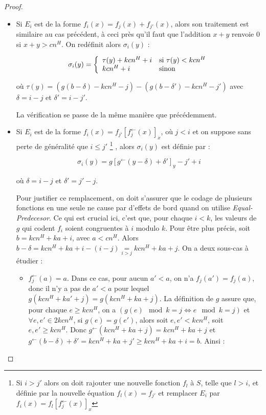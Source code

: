 \documentclass{article}
\newcommand{\eqpred}[3]{#1\left[ #2^{\leftarrow}(#3) \right]_{#3}}
\newcommand{\eqpredfi}[5]{#1\left[ #2^{\leftarrow}(#3) #4 \right]_{#5}} %
\begin{document}
\begin{proof}
\begin{enumerate}[itemsep=-1mm,leftmargin=2cm]
\begin{itemize}[itemsep=-1mm, leftmargin=1cm]
						\item
							Si $E_i$ est de la forme $f_i(x) = f_j(x) + f_{j'}(x)$, alors son traitement est similaire au cas précédent, à ceci près qu'il faut que l'addition $x + y$ renvoie $0$ si $x + y > cn^H$. On redéfinit alors $\sigma_i(y)$ : 
							
							\[
								\sigma_i(y) = \left\lbrace \begin{array}{ll} 
									\tau(y) + kcn^H + i & \text{si $\tau(y) < kcn^H$} \\
									kcn^H + i & \text{sinon}
									 \end{array} \right.
							\]
							
							où $\tau(y) = \left( g\left( b - \delta \right) - kcn^H - j \right) - \left( g\left( b - \delta' \right) - kcn^H - j' \right)$ avec $\delta = i - j$ et $\delta' = i - j'$. 
							
							La vérification se passe de la même manière que précédemment.
							
						\item
							Si $E_i$ est de la forme $f_i(x) = \eqpred{f_{j'}}{f_j}{x}$, où $j < i$ et on suppose sans perte de généralité que $i \leqslant j'$ 
								\footnote{Si $i > j'$ alors on doit rajouter une nouvelle fonction $f_l$ à $S$, telle que $l > i$, et définie par la nouvelle équation $f_l(x) = f_{j'}$ et remplacer $E_i$ par $f_i(x) = \eqpred{f_{l}}{f_j}{x}$}
							, alors $\sigma_i(y)$ est définie par :
							
							\[
								\sigma_i(y) = \eqpredfi{g}{g}{y-\delta}{ + \delta'}{y} - j' + i
							\]
							
							où $\delta = i - j$ et $\delta' = j' - j$.
							
							Pour justifier ce remplacement, on doit s'assurer que le codage de plusieurs fonctions en une seule ne cause par d'effets de bord quand on utilise \emph{Equal-Predecesor}. Ce qui est crucial ici, c'est que, pour chaque $i<k$, les valeurs de $g$ qui codent $f_i$ soient congruentes à $i$ modulo $k$. Pour être plus précis, soit $b = kcn^H + ka + i$, avec $a< cn^H$. Alors $b-\delta = kcn^H + ka + i - (i - j) \underset{i>j}{=} kcn^H + ka + j$. On a deux sous-cas à étudier :
							
							\begin{itemize}[itemsep=-1mm,leftmargin=1cm]
								\item
									$f_j^{\leftarrow}(a) = a$.   Dans ce cas, pour aucun $a' < a$, on n'a $f_j(a') = f_j(a)$, donc il n'y a pas de $a' < a$ pour lequel $g\left( kcn^H + ka' + j \right) = g\left( kcn^H + ka + j \right)$. La définition de $g$ assure que, pour chaque $e \geqslant kcn^H$, on a $\left(g(e) \mod{k} = j \Leftrightarrow e \mod{k} = j\right)$ et $\forall e, e' \in 2kcn^H$, si $g(e) = g(e')$, alors soit $e, e' < kcn^H$, soit $e, e' \geqslant kcn^H$. Donc $g^{\leftarrow} \left( kcn^H + ka + j \right) = kcn^H + ka + j$ et $g^{\leftarrow}\left( b - \delta \right) + \delta' = kcn^H + ka + j' \geqslant kcn^H + ka + i = b$. Ainsi :
									

\end{itemize}
\end{itemize}
\end{enumerate}
\end{proof}
\end{document}
